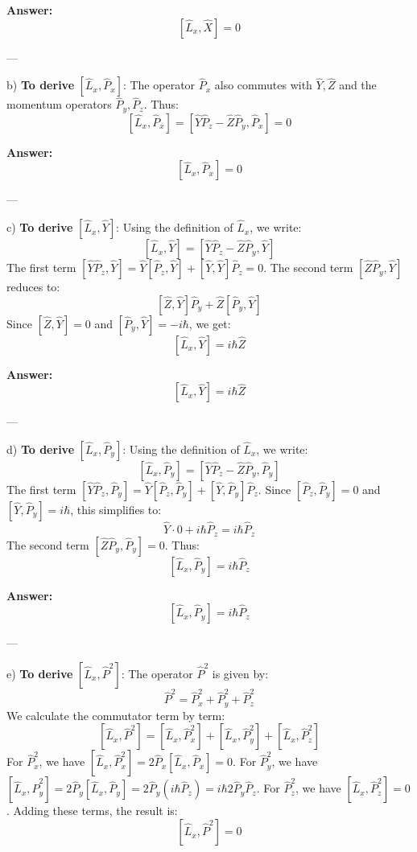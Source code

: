 \documentclass{article}
\begin{document}
\textbf{Answer:}
\[
\left[\hat{L}_x, \hat{X}\right] = 0
\]

---

b) \textbf{To derive} $\left[\hat{L}_x, \hat{P}_x\right]$:  
The operator $\hat{P}_x$ also commutes with $\hat{Y}, \hat{Z}$ and the momentum operators $\hat{P}_y, \hat{P}_z$. Thus:
\[
[\hat{L}_x, \hat{P}_x] = [\hat{Y}\hat{P}_z - \hat{Z}\hat{P}_y, \hat{P}_x] = 0
\]

\textbf{Answer:}
\[
\left[\hat{L}_x, \hat{P}_x\right] = 0
\]

---

c) \textbf{To derive} $\left[\hat{L}_x, \hat{Y}\right]$:  
Using the definition of $\hat{L}_x$, we write:
\[
[\hat{L}_x, \hat{Y}] = [\hat{Y}\hat{P}_z - \hat{Z}\hat{P}_y, \hat{Y}]
\]
The first term $[\hat{Y}\hat{P}_z, \hat{Y}] = \hat{Y}[\hat{P}_z, \hat{Y}] + [\hat{Y}, \hat{Y}]\hat{P}_z = 0$. The second term $[\hat{Z}\hat{P}_y, \hat{Y}]$ reduces to:
\[
[\hat{Z}, \hat{Y}]\hat{P}_y + \hat{Z}[\hat{P}_y, \hat{Y}]
\]
Since $[\hat{Z}, \hat{Y}] = 0$ and $[\hat{P}_y, \hat{Y}] = -i\hbar$, we get:
\[
[\hat{L}_x, \hat{Y}] = i\hbar \hat{Z}
\]

\textbf{Answer:}
\[
\left[\hat{L}_x, \hat{Y}\right] = i\hbar \hat{Z}
\]

---

d) \textbf{To derive} $\left[\hat{L}_x, \hat{P}_y\right]$:  
Using the definition of $\hat{L}_x$, we write:
\[
[\hat{L}_x, \hat{P}_y] = [\hat{Y}\hat{P}_z - \hat{Z}\hat{P}_y, \hat{P}_y]
\]
The first term $[\hat{Y}\hat{P}_z, \hat{P}_y] = \hat{Y}[\hat{P}_z, \hat{P}_y] + [\hat{Y}, \hat{P}_y]\hat{P}_z$. Since $[\hat{P}_z, \hat{P}_y] = 0$ and $[\hat{Y}, \hat{P}_y] = i\hbar$, this simplifies to:
\[
\hat{Y} \cdot 0 + i\hbar \hat{P}_z = i\hbar \hat{P}_z
\]
The second term $[\hat{Z}\hat{P}_y, \hat{P}_y] = 0$. Thus:
\[
[\hat{L}_x, \hat{P}_y] = i\hbar \hat{P}_z
\]

\textbf{Answer:}
\[
\left[\hat{L}_x, \hat{P}_y\right] = i\hbar \hat{P}_z
\]

---

e) \textbf{To derive} $\left[\hat{L}_x, \hat{P}^2\right]$:  
The operator $\hat{P}^2$ is given by:
\[
\hat{P}^2 = \hat{P}_x^2 + \hat{P}_y^2 + \hat{P}_z^2
\]
We calculate the commutator term by term:
\[
[\hat{L}_x, \hat{P}^2] = [\hat{L}_x, \hat{P}_x^2] + [\hat{L}_x, \hat{P}_y^2] + [\hat{L}_x, \hat{P}_z^2]
\]
For $\hat{P}_x^2$, we have $[\hat{L}_x, \hat{P}_x^2] = 2\hat{P}_x[\hat{L}_x, \hat{P}_x] = 0$.  
For $\hat{P}_y^2$, we have $[\hat{L}_x, \hat{P}_y^2] = 2\hat{P}_y[\hat{L}_x, \hat{P}_y] = 2\hat{P}_y(i\hbar \hat{P}_z) = i\hbar 2\hat{P}_y\hat{P}_z$.  
For $\hat{P}_z^2$, we have $[\hat{L}_x, \hat{P}_z^2] = 0$.  
Adding these terms, the result is:
\[
[\hat{L}_x, \hat{P}^2] = 0
\]
\end{document}
